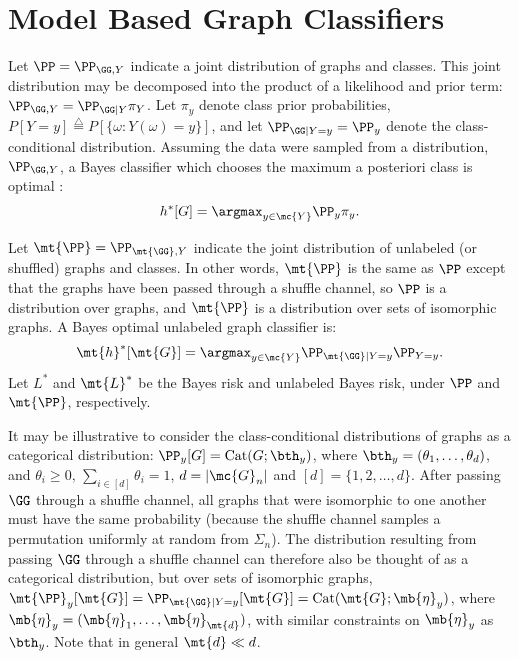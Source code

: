 \documentclass[10pt,journal,cspaper,compsoc]{IEEEtran}
\begin{document}
\section{Model Based Graph Classifiers} %
\label{sec:model_based_graph_classifiers}


Let $\PP=\PP_{\GG,Y}$ indicate a joint distribution of graphs and classes. This joint distribution may be decomposed into the product of a likelihood and prior term: $\PP_{\GG,Y} = \PP_{\GG|Y}\pi_Y$.  Let $\pi_y$ denote class prior probabilities, $P[Y=y]\overset{\triangle}{=}P[\{\omega: Y(\omega)=y\}]$, and let $\PP_{\GG | Y = y}=\PP_y$ denote the class-conditional distribution.  Assuming the data were sampled from a distribution, $\PP_{\GG,Y}$, a Bayes classifier which chooses the maximum a posteriori class is optimal \cite{DEV96}:
\begin{align} \label{eq:bayes}
	 h^*[G] = \argmax_{y \in \mc{Y}} \PP_y \pi_{y}.
\end{align}

Let $\mt{\PP}=\PP_{\mt{\GG},Y}$ indicate the joint distribution of unlabeled (or shuffled) graphs and classes.  In other words, $\mt{\PP}$ is the same as $\PP$ except that the graphs have been passed through a shuffle channel, so $\PP$ is a distribution over graphs, and $\mt{\PP}$ is a distribution over sets of isomorphic graphs.  A Bayes optimal unlabeled graph classifier is:
\begin{align} \label{eq:unbayes}
	 \mt{h}^*[\mt{G}] = \argmax_{y \in \mc{Y}} \PP_{\mt{\GG} | Y=y} \PP_{Y=y}.
\end{align}
Let $L^*$ and $\mt{L}^*$ be the Bayes risk and unlabeled Bayes risk, under $\PP$ and $\mt{\PP}$, respectively.

It may be illustrative to consider the class-conditional distributions of graphs as a categorical distribution: $\PP_{y}[G]=\text{Cat}(G; \bth_y)$, where $\bth_y=(\theta_1,\ldots, \theta_{d})$, and $\theta_i\geq 0, \, \sum_{i \in [d]} \theta_i=1$, $d=|\mc{G}_n|$ and $[d]=\{1,2,\ldots,d\}$. After passing $\GG$ through a shuffle channel, all graphs that were isomorphic to one another must have the same probability (because the shuffle channel samples a permutation uniformly at random from $\Sigma_n$).  The distribution resulting from passing $\GG$ through a shuffle channel can therefore also be thought of as a categorical distribution, but over sets of isomorphic graphs,  $\mt{\PP}_y[\mt{G}]=\PP_{\mt{\GG} | Y=y}[\mt{G}]=\text{Cat}(\mt{G}; \mb{\eta}_y)$, where $\mb{\eta}_y=(\mb{\eta}_1,\ldots, \mb{\eta}_{\mt{d}})$, with similar constraints on $\mb{\eta}_y$ as $\bth_y$.  Note that in general $\mt{d}\ll d$.  
\end{document}
